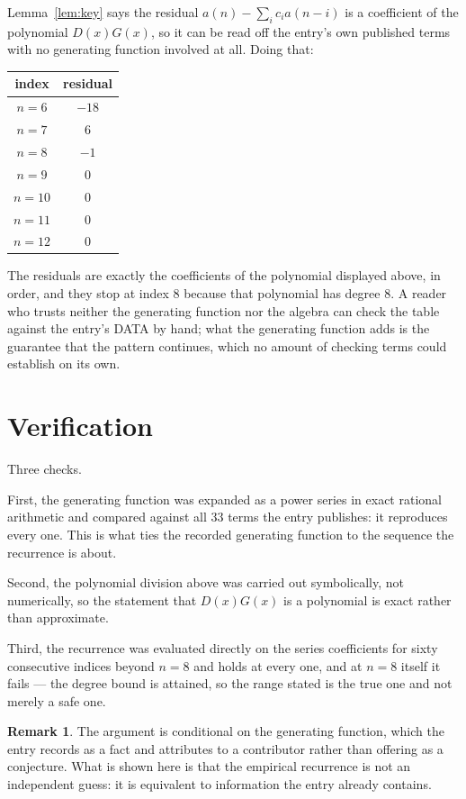 \documentclass[11pt,a4paper]{article}
\theoremstyle{plain}
\theoremstyle{definition}
\newtheorem{remark}[theorem]{Remark}
\begin{document}
Lemma~\ref{lem:key} says the residual $a(n)-\sum_ic_ia(n-i)$ is a coefficient of the
polynomial $D(x)G(x)$, so it can be read off the entry's own published terms with no
generating function involved at all. Doing that:
\begin{center}
\begin{tabular}{cc}
index & residual \\ \hline
$n=6$ & $-18$ \\
$n=7$ & $6$ \\
$n=8$ & $-1$ \\
$n=9$ & $0$ \\
$n=10$ & $0$ \\
$n=11$ & $0$ \\
$n=12$ & $0$
\end{tabular}
\end{center}
The residuals are exactly the coefficients of the polynomial displayed above, in order, and
they stop at index $8$ because that polynomial has degree $8$. A reader who trusts
neither the generating function nor the algebra can check the table against the entry's DATA
by hand; what the generating function adds is the guarantee that the pattern continues, which
no amount of checking terms could establish on its own.

\section{Verification}

Three checks.

First, the generating function was expanded as a power series in exact rational arithmetic and
compared against all $33$ terms the entry publishes: it reproduces every one. This is
what ties the recorded generating function to the sequence the recurrence is about.

Second, the polynomial division above was carried out symbolically, not numerically, so the
statement that $D(x)G(x)$ is a polynomial is exact rather than approximate.

Third, the recurrence was evaluated directly on the series coefficients for sixty consecutive
indices beyond $n=8$ and holds at every one, and at $n=8$ itself it fails --- the
degree bound is attained, so the range stated is the true one and not merely a safe one.

\begin{remark}
The argument is conditional on the generating function, which the entry records as a fact and
attributes to a contributor rather than offering as a conjecture. What is shown here is that
the empirical recurrence is not an independent guess: it is equivalent to information the
entry already contains.
\end{remark}
\end{document}
